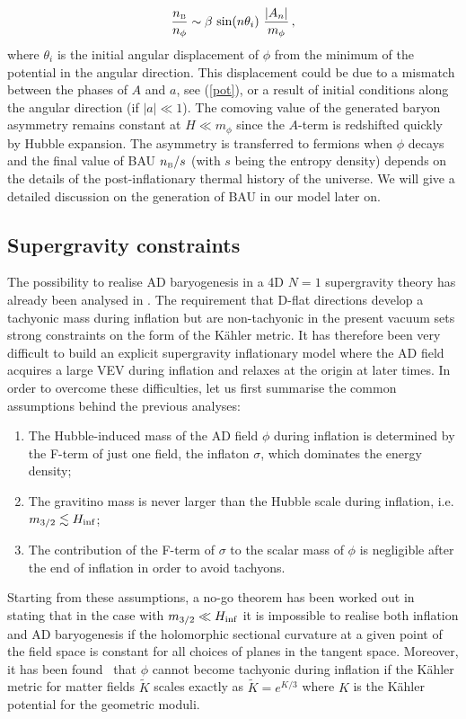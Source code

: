 \documentclass[11pt,a4paper]{article}
\newcommand{\ben}{\begin{enumerate}}
\newcommand{\een}{\end{enumerate}}
\newcommand{\be}{\begin{equation}}
\newcommand{\ee}{\end{equation}}
\def\B{{\scriptscriptstyle \rm B}}
\begin{document}
\be \label{asym}
{n_{\B} \over n_\phi} \sim \beta ~ {\rm sin} (n \theta_i) ~ {|A_n| \over m_\phi}\,,
\ee
where $\theta_i$ is the initial angular displacement of $\phi$ from the minimum of the potential in the angular direction. This displacement could be due to a mismatch between the phases of $A$ and $a$, see (\ref{pot}), or a result of initial conditions along the angular direction (if $|a| \ll 1$). The comoving value of the generated baryon asymmetry remains constant at $H \ll m_\phi$ since the $A$-term is redshifted quickly by Hubble expansion. The asymmetry is transferred to fermions when $\phi$ decays and the final value of BAU $n_\B/s$ (with $s$ being the entropy density) depends on the details of the post-inflationary thermal history of the universe. We will give a detailed discussion on the generation of BAU in our model later on.      

\subsection{Supergravity constraints}
\label{ssec:currentcontraints}

The possibility to realise AD baryogenesis in a 4D $N=1$ supergravity theory has already been analysed in \cite{Casas:1997uk, Dutta:2010sg, Marsh:2011ud, Dutta:2012mw}. The requirement that D-flat directions develop a tachyonic mass during inflation but are non-tachyonic in the present vacuum sets strong constraints on the form of the K\"ahler metric. It has therefore been very difficult to build an explicit supergravity inflationary model where the AD field acquires a large VEV during inflation and relaxes at the origin at later times. 
In order to overcome these difficulties, let us first summarise the common assumptions behind the previous analyses:
\ben
\item The Hubble-induced mass of the AD field $\phi$ during inflation is determined by the F-term of just one field, the inflaton $\sigma$, which dominates the energy density;
\item The gravitino mass is never larger than the Hubble scale during inflation, i.e. $m_{3/2} \lesssim H_{\rm inf}$;
\item The contribution of the F-term of $\sigma$ to the scalar mass of $\phi$ is negligible after the end of inflation in order to avoid tachyons.
\een
Starting from these assumptions, a no-go theorem has been worked out in~\cite{Dutta:2012mw} stating that in the case with $m_{3/2}\ll H_{\rm inf}$ it is impossible to realise both inflation and AD baryogenesis if the holomorphic sectional curvature at a given point of the field space is constant for all choices of planes in the tangent space. Moreover, it has been found~\cite{Casas:1997uk, Dutta:2010sg, Marsh:2011ud} that $\phi$ cannot become tachyonic during inflation if the K\"ahler metric for matter fields $\tilde{K}$ scales exactly as $\tilde{K} = e^{K/3}$ where $K$ is the K\"ahler potential for the geometric moduli. 
\end{document}
